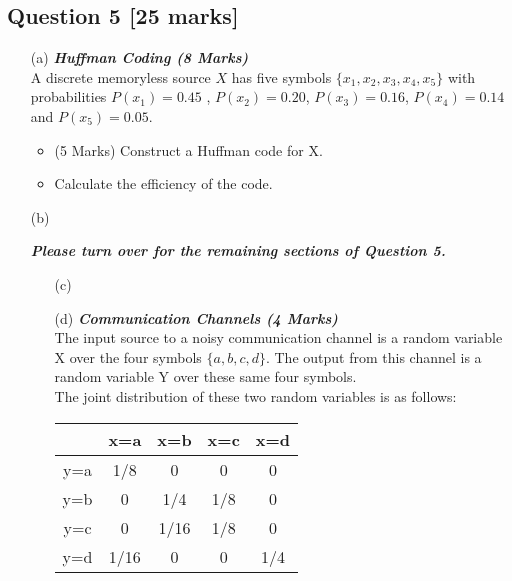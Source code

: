 
\newpage
\subsection*{Question 5 [25 marks] }
\begin{itemize}
\item[(a)] \textbf{\textit{Huffman Coding (8 Marks)}}\\
A discrete memoryless source $X$ has five symbols $\{x_1,x_2,x_3,x_4,x_5\}$ with probabilities $P(x_1) = 0.45$ , $P(x_2) = 0.20$, $P(x_3) = 0.16$, $P(x_4) = 0.14$ and $P(x_5) = 0.05$.

\begin{itemize}
\item (5 Marks) Construct a Huffman code for X.
\item  Calculate the efficiency of the code.
\end{itemize}
\bigskip
\item[(b)] 

{
\normalsize
\textit{\textbf{Please turn over for the remaining sections of Question 5.}}
}

\newpage
\begin{itemize}
\item[(c)]


\item[(d)] \textbf{\textit{Communication Channels (4 Marks)}}\\
The input source to a noisy communication channel is a random variable X over the
four symbols $\{a, b, c, d\}$. The output from this channel is a random variable Y over these same
four symbols. \\
\vspace{0.3cm}
\noindent 
The joint distribution of these two random variables is as follows:\\ \bigskip

\begin{center}
\begin{tabular}{|c|c|c|c|c|}
\hline
&x=a& x=b & x=c & x=d \\ \hline
y=a &1/8 &0 &0 & 0 \\ \hline
y=b &0 & 1/4& 1/8& 0 \\ \hline
y=c & 0&1/16 & 1/8 & 0\\ \hline
y=d & 1/16& 0& 0 & 1/4\\ \hline
\end{tabular}
\end{center}


\end{itemize}
\end{itemize}
